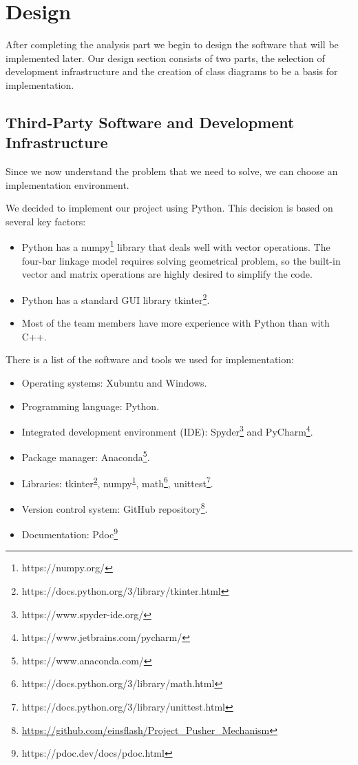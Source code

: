 \documentclass{article}
\begin{document}
\section{Design} \label{ch:design}

After completing the analysis part we begin to design the software that will be implemented later. Our design section consists of two parts, the selection of development infrastructure and the creation of class diagrams to be a basis for implementation.

\subsection{Third-Party Software and Development Infrastructure}

Since we now understand the problem that we need to solve, we can choose an implementation environment.

We decided to implement our project using Python. This decision is based on several key factors:
\begin{itemize}
	\item Python has a numpy\footnote{\label{fn:numpy} https://numpy.org/} library that deals well with vector operations. The four-bar linkage model requires solving geometrical problem, so the built-in vector and matrix operations are highly desired to simplify the code.
	\item Python has a standard GUI library tkinter\footnote{\label{fn:tkinter} https://docs.python.org/3/library/tkinter.html}.
	\item Most of the team members have more experience with Python than with C++.
\end{itemize}

There is a list of the software and tools we used for implementation:
\begin{itemize}
	\item Operating systems: Xubuntu and Windows.
	\item Programming language: Python.
	\item Integrated development environment (IDE): Spyder\footnote{https://www.spyder-ide.org/} and PyCharm\footnote{https://www.jetbrains.com/pycharm/}.
	\item Package manager: Anaconda\footnote{https://www.anaconda.com/}.
	\item Libraries: tkinter\textsuperscript{\ref{fn:tkinter}}, numpy\textsuperscript{\ref{fn:numpy}}, math\footnote{https://docs.python.org/3/library/math.html}, unittest\footnote{https://docs.python.org/3/library/unittest.html}.
	\item Version control system: GitHub repository\footnote{\url{https://github.com/einsflash/Project_Pusher_Mechanism}}.
	\item Documentation: Pdoc\footnote{https://pdoc.dev/docs/pdoc.html}
\end{itemize}
\end{document}
